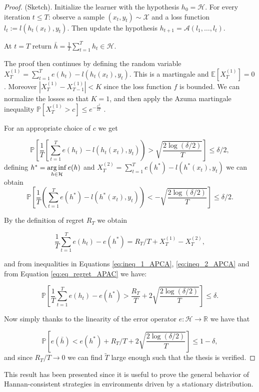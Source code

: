 \begin{proof}(Sketch).
Initialize the learner with the hypothesis $h_0=\mathcal H$.
For every iteration $t\le T$: observe a sample $(x_t,y_t)\sim\mathcal X$ and a loss function $l_t:=l(h_t(x_t),y_t)$. Then update the hypothesis $h_{t+1}=\mathcal A(l_1,\ldots,l_t)$.

At $t=T$ return $\bar{h}=\frac{1}{T}\sum\limits_{t=1}^T h_t\in\mathcal H$. 

The proof then continues by defining the random variable $X^{(1)}_T=\sum\limits_{t=1}^Te(h_t)-l(h_t(x_t),y_t)$. This is a martingale and $\mathbb E[X^{(1)}_T]=0$. Moreover $|X^{(1)}_T-X^{(1)}_{T-1}|<K$ since the loss function $f$ is bounded. We can normalize the losses so that $K=1$, and then apply the Azuma martingale inequality $\mathbb P[X^{(1)}_T>c]\le e^{-\frac{c^2}{2T}}$ \cite{azuma1967weighted}.

For an appropriate choice of $c$ we get

\begin{equation}\label{eq:ineq_1_APCA}
\mathbb P\left[\frac{1}{T}\left[\sum\limits_{t=1}^Te(h_t)-l(h_t(x_t),y_t)\right)>\sqrt{\frac{2\log(\delta/2)}{T}}\right]\le \delta/2,
\end{equation}
defining $h^*=\operatorname*{arg\,inf}\limits_{h\in\mathcal H} e(h)$ and $X^{(2)}_T=\sum\limits_{t=1}^Te(h^*)-l(h^*(x_t),y_t)$ we can obtain
\begin{equation}\label{eq:ineq_2_APCA}
\mathbb P\left[\frac{1}{T}\left(\sum\limits_{t=1}^Te(h^*)-l(h^*(x_t),y_t)\right)<-\sqrt{\frac{2\log(\delta/2)}{T}}\right]\le \delta/2.
\end{equation}

By the definition of regret $R_T$ we obtain

\begin{equation}\label{eq:eq_regret_APAC}
\frac{1}{T}\sum\limits_{t=1}^Te(h_t)-e(h^*)=R_T/T+X_T^{(1)}-X_T^{(2)},
\end{equation}

and from inequalities in Equations \eqref{eq:ineq_1_APCA}, \eqref{eq:ineq_2_APCA} and from Equation \eqref{eq:eq_regret_APAC} we have:

\begin{equation}
\mathbb P\left[\frac{1}{T}\sum\limits_{t=1}^Te(h_t)-e(h^*)>\frac{R_T}{T}+2\sqrt{\frac{2\log(\delta/2)}{T}}\right]\le \delta.
\end{equation}

Now simply thanks to the linearity of the error operator $e:\mathcal H\to \mathbb R$ we have that 

\begin{equation*}
\mathbb P\left[e(\bar h)<e(h^*)+R_T/T+2\sqrt{\frac{2\log(\delta/2)}{T}}\right]\le 1-\delta,
\end{equation*}
and since $R_T/T\to0$ we can find $\tilde T$ large enough such that the thesis is verified.
\end{proof}

This result has been presented since it is useful to prove the general behavior of Hannan-consistent strategies in environments driven by a stationary distribution.